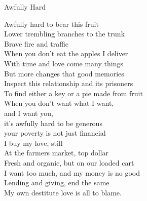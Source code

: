 Awfully Hard

Awfully hard to bear this fruit\\
Lower trembling branches to the trunk\\
Brave fire and traffic\\
When you don't eat the apples I deliver\\

With time and love come many things\\
But more changes that good memories\\
Inspect this relationship and its prisoners\\
To find either a key or a pie made from fruit\\

When you don't want what I want,\\
and I want you,\\
it's awfully hard to be generous\\
your poverty is not just financial\\

I buy my love, still\\
At the farmers market, top dollar\\
Fresh and organic, but on our loaded cart\\
I want too much, and my money is no good\\

Lending and giving, end the same\\
My own destitute love is all to blame.\\

